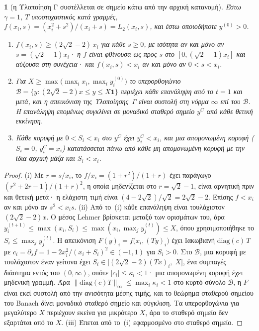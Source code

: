 \documentclass[11pt,a4paper]{article}
\theoremstyle{definition}
\theoremstyle{plain}
\newcommand{\genpropname}{}
\newtheorem*{genprop}{\genpropname}
\newenvironment{prop}[1]{\renewcommand{\genpropname}{Πρόταση #1}\begin{genprop}}{\end{genprop}}
\newcommand{\diag}{\mathrm{diag}}
\newcommand{\one}{\mathbf{1}}
\begin{document}
\begin{prop}{D}[η Υλοποίηση Γ συστέλλεται σε σημείο κάτω από την αρχική κατανομή]
Έστω $\gamma=1$, $T$ υποστοχαστικός κατά γραμμές, $f(x_i,s)=(x_i^2+s^2)/(x_i+s)=L_2(x_i,s)$, και έστω οποιοδήποτε $y^{(0)}>0$.
\begin{enumerate}[label=(\roman*),leftmargin=2em]
\item $f(x_i,s)\ge(2\sqrt2-2)\,x_i$ για κάθε $s\ge0$, με ισότητα αν και μόνο αν $s=(\sqrt2-1)x_i$· η $f$ είναι φθίνουσα ως προς $s$ στο $[0,(\sqrt2-1)x_i]$ και αύξουσα στη συνέχεια· και $f(x_i,s)<x_i$ αν και μόνο αν $0<s<x_i$.
\item Για $X\ge\max\big(\max_ix_i,\max_iy^{(0)}_i\big)$ το υπερορθογώνιο $\mathcal B=\{y:(2\sqrt2-2)x\le y\le X\one\}$ περιέχει κάθε επανάληψη από το $t=1$ και μετά, και η απεικόνιση της Υλοποίησης~Γ είναι συστολή στη νόρμα $\infty$ επί του $\mathcal B$. Η επανάληψη επομένως συγκλίνει σε μοναδικό σταθερό σημείο $y^C$ από κάθε θετική εκκίνηση.
\item Κάθε κορυφή με $0<S_i<x_i$ στο $y^C$ έχει $y^C_i<x_i$, και μια απομονωμένη κορυφή ($S_i=0$, $y^C_i=x_i$) κατατάσσεται πάνω από κάθε μη απομονωμένη κορυφή με την ίδια αρχική μάζα και $S_i<x_i$.
\end{enumerate}
\end{prop}

\begin{proof}
(i) Με $r=s/x_i$, το $f/x_i=(1+r^2)/(1+r)$ έχει παράγωγο $(r^2+2r-1)/(1+r)^2$, η οποία μηδενίζεται στο $r=\sqrt2-1$, είναι αρνητική πριν και θετική μετά· η ελάχιστη τιμή είναι $(4-2\sqrt2)/\sqrt2=2\sqrt2-2$. Επίσης $f<x_i$ αν και μόνο αν $s^2<x_is$. (ii) Από το~(i) κάθε επανάληψη είναι τουλάχιστον $(2\sqrt2-2)x$. Ο μέσος Lehmer βρίσκεται μεταξύ των ορισμάτων του, άρα $y^{(t+1)}_i\le\max(x_i,S_i)\le\max(x_i,\max_jy^{(t)}_j)\le X$, όπου χρησιμοποιήθηκε το $S_i\le\max_jy^{(t)}_j$. Η απεικόνιση $F(y)_i=f\big(x_i,(Ty)_i\big)$ έχει Ιακωβιανή $\diag(c)\,T$ με $c_i=\partial_sf=1-2x_i^2/(x_i+S_i)^2\in(-1,1)$ για $S_i>0$. Στο $\mathcal B$, μια κορυφή με τουλάχιστον έναν γείτονα έχει $S_i\in\big[(2\sqrt2-2)(Tx)_i,\;X\big]$, ένα συμπαγές διάστημα εντός του $(0,\infty)$, οπότε $|c_i|\le\kappa_i<1$· μια απομονωμένη κορυφή έχει μηδενική γραμμή. Άρα $\|\diag(c)T\|_\infty\le\max_i\kappa_i<1$ στο κυρτό σύνολο $\mathcal B$, η $F$ είναι εκεί συστολή από την ανισότητα μέσης τιμής, και το θεώρημα σταθερού σημείου του Banach δίνει μοναδικό σταθερό σημείο και σύγκλιση. Τα υπερορθογώνια για μεγαλύτερο $X$ περιέχουν εκείνα για μικρότερο $X$, άρα το σταθερό σημείο δεν εξαρτάται από το $X$. (iii) Έπεται από το~(i) εφαρμοσμένο στο σταθερό σημείο.
\end{proof}
\end{document}
